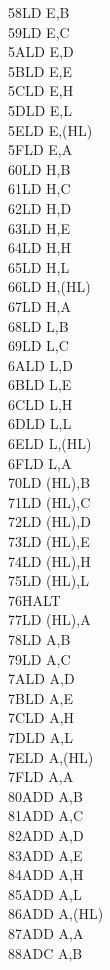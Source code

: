 \documentclass[oneside,a4paper]{book}
\begin{document}
\begin{multicols}{3}
{\begin{tabbing}
58\>LD E,B\\
59\>LD E,C\\
5A\>LD E,D\\
5B\>LD E,E\\
5C\>LD E,H\\
5D\>LD E,L\\
5E\>LD E,(HL)\\
5F\>LD E,A\\
60\>LD H,B\\
61\>LD H,C\\
62\>LD H,D\\
63\>LD H,E\\
64\>LD H,H\\
65\>LD H,L\\
66\>LD H,(HL)\\
67\>LD H,A\\
68\>LD L,B\\
69\>LD L,C\\
6A\>LD L,D\\
6B\>LD L,E\\
6C\>LD L,H\\
6D\>LD L,L\\
6E\>LD L,(HL)\\
6F\>LD L,A\\
70\>LD (HL),B\\
71\>LD (HL),C\\
72\>LD (HL),D\\
73\>LD (HL),E\\
74\>LD (HL),H\\
75\>LD (HL),L\\
76\>HALT\\
77\>LD (HL),A\\
78\>LD A,B\\
79\>LD A,C\\
7A\>LD A,D\\
7B\>LD A,E\\
7C\>LD A,H\\
7D\>LD A,L\\
7E\>LD A,(HL)\\
7F\>LD A,A\\
80\>ADD A,B\\
81\>ADD A,C\\
82\>ADD A,D\\
83\>ADD A,E\\
84\>ADD A,H\\
85\>ADD A,L\\
86\>ADD A,(HL)\\
87\>ADD A,A\\
88\>ADC A,B\\

\end{tabbing}}
\end{multicols}
\end{document}
